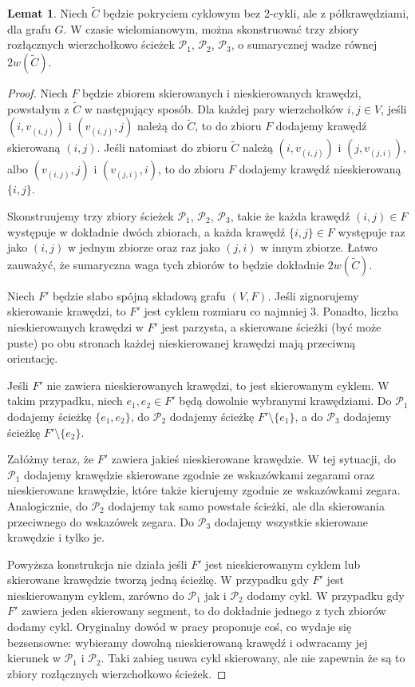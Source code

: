 \documentclass[a4paper,12pt]{article}
\theoremstyle{definition}
\newtheorem{lemma}{Lemat}
\begin{document}
\begin{lemma}
  Niech $\tilde{C}$ będzie pokryciem cyklowym bez 2-cykli, ale z półkrawędziami, dla grafu $G$. W czasie wielomianowym, można skonstruować trzy zbiory rozłącznych wierzchołkowo ścieżek $\mathcal{P}_1$, $\mathcal{P}_2$, $\mathcal{P}_3$, o sumarycznej wadze równej $2w(\tilde{C})$.
\end{lemma}
\begin{proof}
  Niech $F$ będzie zbiorem skierowanych i nieskierowanych krawędzi, powstałym z $\tilde{C}$ w następujący sposób. Dla każdej pary wierzchołków $i, j \in V$, jeśli $(i, v_{(i,j)})$ i $(v_{(i,j)}, j)$ należą do $\tilde{C}$, to do zbioru $F$ dodajemy krawędź skierowaną $(i, j)$. Jeśli natomiast do zbioru $\tilde{C}$ należą $(i, v_{(i,j)})$ i $(j, v_{(j,i)})$, albo $(v_{(i,j)}, j)$ i $(v_{(j,i)}, i)$, to do zbioru $F$ dodajemy krawędź nieskierowaną $\{i,j\}$.

  Skonstruujemy trzy zbiory ścieżek $\mathcal{P}_1$, $\mathcal{P}_2$, $\mathcal{P}_3$, takie że każda krawędź $(i, j) \in F$ występuje w dokładnie dwóch zbiorach, a każda krawędź $\{i,j\} \in F$ występuje raz jako $(i, j)$ w jednym zbiorze oraz raz jako $(j, i)$ w innym zbiorze. Łatwo zauważyć, że sumaryczna waga tych zbiorów to będzie dokładnie $2w(\tilde{C})$.

  Niech $F'$ będzie słabo spójną składową grafu $(V, F)$. Jeśli zignorujemy skierowanie krawędzi, to $F'$ jest cyklem rozmiaru co najmniej $3$. Ponadto, liczba nieskierowanych krawędzi w $F'$ jest parzysta, a skierowane ścieżki (być może puste) po obu stronach każdej nieskierowanej krawędzi mają przeciwną orientację.

  Jeśli $F'$ nie zawiera nieskierowanych krawędzi, to jest skierowanym cyklem. W takim przypadku, niech $e_1, e_2 \in F'$ będą dowolnie wybranymi krawędziami. Do $\mathcal{P}_1$ dodajemy ścieżkę $\{e_1, e_2\}$, do $\mathcal{P}_2$ dodajemy ścieżkę $F' \setminus \{e_1\}$, a do $\mathcal{P}_3$ dodajemy ścieżkę $F' \setminus \{e_2\}$.

  Załóżmy teraz, że $F'$ zawiera jakieś nieskierowane krawędzie. W tej sytuacji, do $\mathcal{P}_1$ dodajemy krawędzie skierowane zgodnie ze wskazówkami zegarami oraz nieskierowane krawędzie, które także kierujemy zgodnie ze wskazówkami zegara.
  Analogicznie, do $\mathcal{P}_2$ dodajemy tak samo powstałe ścieżki, ale dla skierowania przeciwnego do wskazówek zegara.
  Do $\mathcal{P}_3$ dodajemy wszystkie skierowane krawędzie i tylko je.

  Powyższa konstrukcja nie działa jeśli $F'$ jest nieskierowanym cyklem lub skierowane krawędzie tworzą jedną ścieżkę.
  W przypadku gdy $F'$ jest nieskierowanym cyklem, zarówno do $\mathcal{P}_1$ jak i $\mathcal{P}_2$ dodamy cykl.
  W przypadku gdy $F'$ zawiera jeden skierowany segment, to do dokładnie jednego z tych zbiorów dodamy cykl.
  Oryginalny dowód w pracy proponuje coś, co wydaje się bezsensowne: wybieramy dowolną nieskierowaną krawędź i odwracamy jej kierunek w $\mathcal{P}_1$ i $\mathcal{P}_2$. Taki zabieg usuwa cykl skierowany, ale nie zapewnia że są to zbiory rozłącznych wierzchołkowo ścieżek.


\end{proof}
\end{document}
